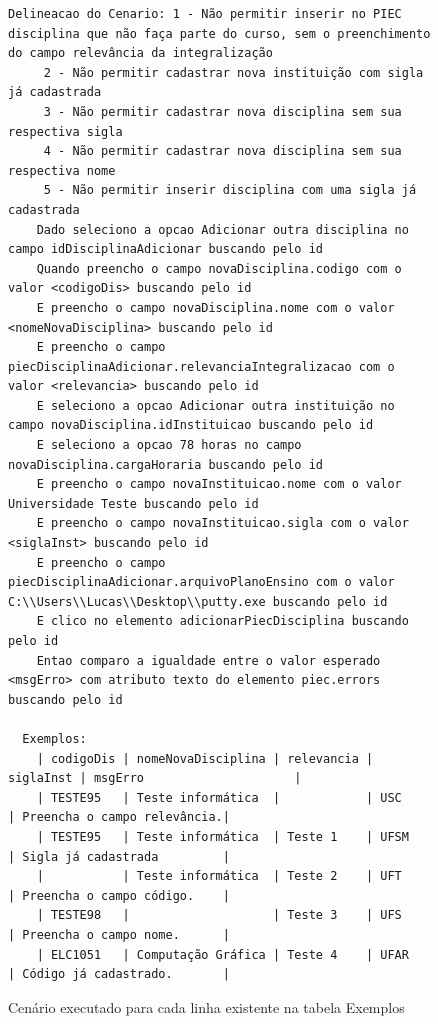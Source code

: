 \documentclass[tg]{mdtufsm}
\begin{document}
\begin{figure}[!htt]
	\begin{lstlisting}
Delineacao do Cenario: 1 - Não permitir inserir no PIEC disciplina que não faça parte do curso, sem o preenchimento do campo relevância da integralização
     2 - Não permitir cadastrar nova instituição com sigla já cadastrada
     3 - Não permitir cadastrar nova disciplina sem sua respectiva sigla
     4 - Não permitir cadastrar nova disciplina sem sua respectiva nome
     5 - Não permitir inserir disciplina com uma sigla já cadastrada
    Dado seleciono a opcao Adicionar outra disciplina no campo idDisciplinaAdicionar buscando pelo id
    Quando preencho o campo novaDisciplina.codigo com o valor <codigoDis> buscando pelo id
    E preencho o campo novaDisciplina.nome com o valor <nomeNovaDisciplina> buscando pelo id
    E preencho o campo piecDisciplinaAdicionar.relevanciaIntegralizacao com o valor <relevancia> buscando pelo id
    E seleciono a opcao Adicionar outra instituição no campo novaDisciplina.idInstituicao buscando pelo id
    E seleciono a opcao 78 horas no campo novaDisciplina.cargaHoraria buscando pelo id
    E preencho o campo novaInstituicao.nome com o valor Universidade Teste buscando pelo id
    E preencho o campo novaInstituicao.sigla com o valor <siglaInst> buscando pelo id
    E preencho o campo piecDisciplinaAdicionar.arquivoPlanoEnsino com o valor C:\\Users\\Lucas\\Desktop\\putty.exe buscando pelo id
    E clico no elemento adicionarPiecDisciplina buscando pelo id
    Entao comparo a igualdade entre o valor esperado <msgErro> com atributo texto do elemento piec.errors buscando pelo id

  Exemplos:
    | codigoDis | nomeNovaDisciplina | relevancia | siglaInst | msgErro                     |
    | TESTE95   | Teste informática  |            | USC       | Preencha o campo relevância.|
    | TESTE95   | Teste informática  | Teste 1    | UFSM      | Sigla já cadastrada         |
    |           | Teste informática  | Teste 2    | UFT       | Preencha o campo código.    |
    | TESTE98   |                    | Teste 3    | UFS       | Preencha o campo nome.      |
    | ELC1051   | Computação Gráfica | Teste 4    | UFAR      | Código já cadastrado.       |
	\end{lstlisting}
	\caption{Cenário executado para cada linha existente na tabela Exemplos}
	\label{code:Delineacao}
\end{figure}
\end{document}
